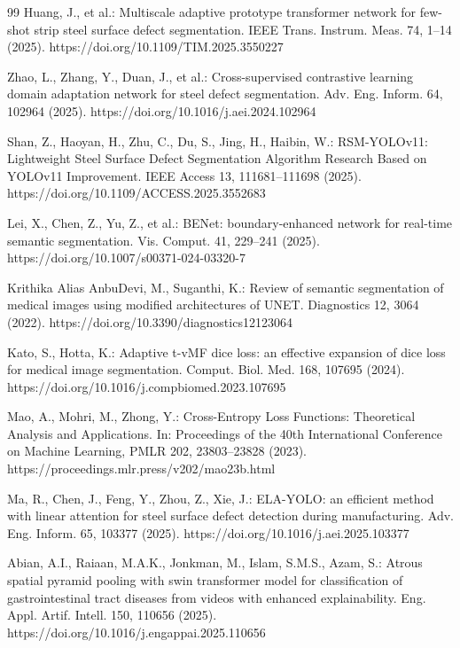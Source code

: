 \documentclass[sn-basic]{sn-jnl}
\theoremstyle{thmstyleone}%
\theoremstyle{thmstyletwo}%
\theoremstyle{thmstylethree}%
\begin{document}
\begin{thebibliography}{99}
 Huang, J., et al.: Multiscale adaptive prototype transformer network for few-shot strip steel surface defect segmentation. IEEE Trans. Instrum. Meas. 74, 1–14 (2025). https://doi.org/10.1109/TIM.2025.3550227

 Zhao, L., Zhang, Y., Duan, J., et al.: Cross-supervised contrastive learning domain adaptation network for steel defect segmentation. Adv. Eng. Inform. 64, 102964 (2025). https://doi.org/10.1016/j.aei.2024.102964

 Shan, Z., Haoyan, H., Zhu, C., Du, S., Jing, H., Haibin, W.: RSM-YOLOv11: Lightweight Steel Surface Defect Segmentation Algorithm Research Based on YOLOv11 Improvement. IEEE Access 13, 111681–111698 (2025). https://doi.org/10.1109/ACCESS.2025.3552683

 Lei, X., Chen, Z., Yu, Z., et al.: BENet: boundary-enhanced network for real-time semantic segmentation. Vis. Comput. 41, 229–241 (2025). https://doi.org/10.1007/s00371-024-03320-7

 Krithika Alias AnbuDevi, M., Suganthi, K.: Review of semantic segmentation of medical images using modified architectures of UNET. Diagnostics 12, 3064 (2022). https://doi.org/10.3390/diagnostics12123064

 Kato, S., Hotta, K.: Adaptive t-vMF dice loss: an effective expansion of dice loss for medical image segmentation. Comput. Biol. Med. 168, 107695 (2024). https://doi.org/10.1016/j.compbiomed.2023.107695

 Mao, A., Mohri, M., Zhong, Y.: Cross-Entropy Loss Functions: Theoretical Analysis and Applications. In: Proceedings of the 40th International Conference on Machine Learning, PMLR 202, 23803–23828 (2023). https://proceedings.mlr.press/v202/mao23b.html

 Ma, R., Chen, J., Feng, Y., Zhou, Z., Xie, J.: ELA-YOLO: an efficient method with linear attention for steel surface defect detection during manufacturing. Adv. Eng. Inform. 65, 103377 (2025). https://doi.org/10.1016/j.aei.2025.103377

 Abian, A.I., Raiaan, M.A.K., Jonkman, M., Islam, S.M.S., Azam, S.: Atrous spatial pyramid pooling with swin transformer model for classification of gastrointestinal tract diseases from videos with enhanced explainability. Eng. Appl. Artif. Intell. 150, 110656 (2025). https://doi.org/10.1016/j.engappai.2025.110656


\end{thebibliography}
\end{document}
